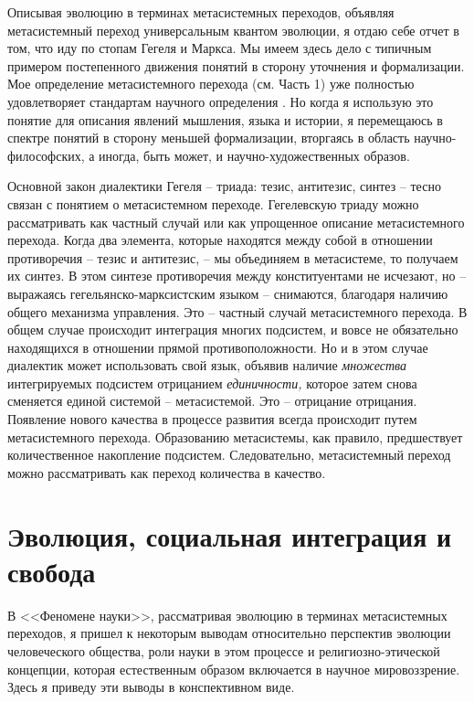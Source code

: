 \documentclass{book}
\begin{document}
Описывая эволюцию в терминах метасистемных переходов, объявляя метасистемный переход универсальным квантом эволюции, я отдаю себе отчет в том, что иду по стопам Гегеля и Маркса. Мы имеем здесь дело с типичным примером постепен­ного движения понятий в сторону уточнения и формализации. Мое определение метасистемного перехода (см. Часть 1) уже полностью удовлетворяет стандартам научного определения%
.
Но когда я использую это понятие для описания явлений мыш­ления, языка и истории, я перемещаюсь в спектре понятий в сторону меньшей формализации, вторгаясь в область научно-философских, а иногда, быть может, и научно-художественных образов.

Основной закон диалектики Гегеля -- триада: тезис, антитезис, синтез -- тесно связан с понятием о метасистемном переходе. Гегелевскую триаду можно рассматривать как частный случай или как упрощенное описание метасистемного перехода. Когда два элемента, которые находятся между собой в отношении противоречия -- тезис и антитезис, -- мы объединяем в метасистеме, то получаем их синтез. В этом синтезе противоречия между конституентами не исчезают, но -- выражаясь гегельянско-марксистским языком -- снимаются, благодаря наличию общего механизма управления. Это -- частный случай метасистемного перехода. В общем случае происходит интег­рация многих подсистем, и вовсе не обязательно находящихся в отношении прямой противоположности. Но и в этом случае диалектик может использовать свой язык, объявив наличие \textit{множества}  интегрируемых подсистем отрицанием \textit{единичности,} которое затем снова сменяется единой системой -- метасистемой. Это -- отрицание отрицания. Появление нового качества в процессе развития всегда происходит 
путем метасистемного перехода. Образованию метасистемы, как правило, предшествует количественное накопление подсистем. Следовательно, метасистемный переход можно рассматривать как переход количества в качество.


\section{Эволюция, социальная интеграция и свобода}

В <<Феномене науки>>, рассматривая эволюцию в терминах метасистемных переходов, я пришел к некоторым выводам относительно перспектив эволюции человеческого общества, роли науки в этом процессе и религиозно-этической концепции, которая естественным образом включается в научное ми­ровоззрение. Здесь я приведу эти выводы в конспективном виде.
\end{document}
